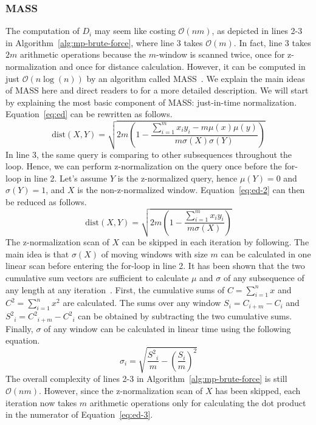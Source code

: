 \subsubsection{MASS}
The computation of $D_i$ may seem like costing $\mathcal{O}(nm)$, as depicted in lines 2-3 in Algorithm~\ref{alg:mp-brute-force}, where line 3 takes $\mathcal{O}(m)$.
In fact, line 3 takes $2m$ arithmetic operations because the $m$-window is scanned twice, once for z-normalization and once for distance calculation.
However, it can be computed in just $\mathcal{O}(n\log(n))$ by an algorithm called MASS~\cite{zhong2024mass}.
We explain the main ideas of MASS here and direct readers to \cite{zhong2024mass} for a more detailed description.
We will start by explaining the most basic component of MASS: just-in-time normalization.
Equation~\ref{eq:ed} can be rewritten as follows.
\begin{equation} 
    \label{eq:ed-2}
    \mathrm{dist}(X, Y) = \sqrt{2m(1 - \frac{\sum_{i=1}^mx_iy_i - m\mu(x)\mu(y)}{m \sigma(X) \sigma(Y)})}
\end{equation}
In line 3, the same query is comparing to other subsequences throughout the loop.
Hence, we can perform z-normalization on the query once before the for-loop in line 2.
Let's assume $Y$ is the z-normalized query, hence $\mu(Y) = 0$ and $\sigma(Y) = 1$, and $X$ is the non-z-normalized window.
Equation~\ref{eq:ed-2} can then be reduced as follows.
\begin{equation} 
    \label{eq:ed-3}
    \mathrm{dist}(X, Y) = \sqrt{2m(1 - \frac{\sum_{i=1}^mx_iy_i}{m \sigma(X)})}
\end{equation}
The z-normalization scan of $X$ can be skipped in each iteration by following.
The main idea is that $\sigma(X)$ of moving windows with size $m$ can be calculated in one linear scan before entering the for-loop in line 2.
It has been shown that the two cumulative sum vectors are sufficient to calculate $\mu$ and $\sigma$ of any subsequence of any length at any iteration~\cite{yeh2016matrix}.
First, the cumulative sums of $C = \sum_{i=1}^n x$ and $C^2 = \sum_{i=1}^n x^2$ are calculated.
The sums over any window $S_i = C_{i+m} - C_i$ and ${S^2}_i = {C^2}_{i+m} - {C^2}_{i}$ can be obtained by subtracting the two cumulative sums. 
Finally, $\sigma$ of any window can be calculated in linear time using the following equation.
\begin{equation} 
    \label{eq:sigma}
    \sigma_i = \sqrt{\frac{{S^2}_i}{m} - (\frac{S_i}{m})^2}
\end{equation}
The overall complexity of lines 2-3 in Algorithm~\ref{alg:mp-brute-force} is still $\mathcal{O}(nm)$.
However, since the z-normalization scan of $X$ has been skipped, each iteration now takes $m$ arithmetic operations only for calculating the dot product in the numerator of Equation~\ref{eq:ed-3}.

